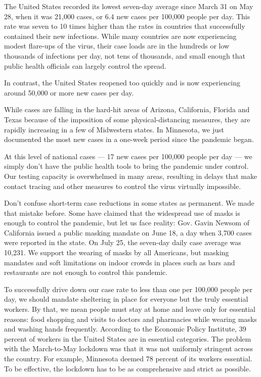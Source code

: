 The United States recorded its lowest seven-day average since March 31
on May 28, when it was 21,000 cases, or 6.4 new cases per 100,000 people
per day. This rate was seven to 10 times higher than the rates in
countries that successfully contained their new infections. While many
countries are now experiencing modest flare-ups of the virus, their case
loads are in the hundreds or low thousands of infections per day, not
tens of thousands, and small enough that public health officials can
largely control the spread.

In contrast, the United States reopened too quickly and is now
experiencing around 50,000 or more new cases per day.

While cases are falling in the hard-hit areas of Arizona, California,
Florida and Texas because of the imposition of some physical-distancing
measures, they are rapidly increasing in a few of Midwestern states. In
Minnesota, we just documented the most new cases in a one-week period
since the pandemic began.

At this level of national cases --- 17 new cases per 100,000 people per
day --- we simply don't have the public health tools to bring the
pandemic under control. Our testing capacity is overwhelmed in many
areas, resulting in delays that make contact tracing and other measures
to control the virus virtually impossible.

Don't confuse short-term case reductions in some states as permanent. We
made that mistake before. Some have claimed that the widespread use of
masks is enough to control the pandemic, but let us face reality: Gov.
Gavin Newsom of California issued a public masking mandate on June 18, a
day when 3,700 cases were reported in the state. On July 25, the
seven-day daily case average was 10,231. We support the wearing of masks
by all Americans, but masking mandates and soft limitations on indoor
crowds in places such as bars and restaurants are not enough to control
this pandemic.

To successfully drive down our case rate to less than one per 100,000
people per day, we should mandate sheltering in place for everyone but
the truly essential workers. By that, we mean people must stay at home
and leave only for essential reasons: food shopping and visits to
doctors and pharmacies while wearing masks and washing hands frequently.
According to the Economic Policy Institute, 39 percent of workers in the
United States are in essential categories. The problem with the
March-to-May lockdown was that it was not uniformly stringent across the
country. For example, Minnesota deemed 78 percent of its workers
essential. To be effective, the lockdown has to be as comprehensive and
strict as possible.

